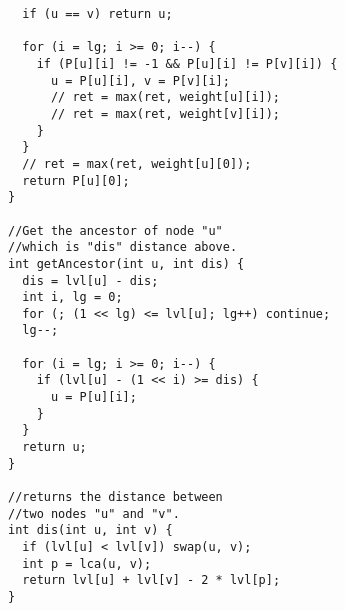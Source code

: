 \documentclass[10pt,a4paper,onesided]{article}
\begin{document}
\begin{multicols*}{3}
\begin{lstlisting}
  if (u == v) return u;

  for (i = lg; i >= 0; i--) {
    if (P[u][i] != -1 && P[u][i] != P[v][i]) {
      u = P[u][i], v = P[v][i];
      // ret = max(ret, weight[u][i]);
      // ret = max(ret, weight[v][i]);
    }
  }
  // ret = max(ret, weight[u][0]);
  return P[u][0];
}

//Get the ancestor of node "u"
//which is "dis" distance above.
int getAncestor(int u, int dis) {
  dis = lvl[u] - dis;
  int i, lg = 0;
  for (; (1 << lg) <= lvl[u]; lg++) continue;
  lg--;

  for (i = lg; i >= 0; i--) {
    if (lvl[u] - (1 << i) >= dis) {
      u = P[u][i];
    }
  }
  return u;
}

//returns the distance between
//two nodes "u" and "v".
int dis(int u, int v) {
  if (lvl[u] < lvl[v]) swap(u, v);
  int p = lca(u, v);
  return lvl[u] + lvl[v] - 2 * lvl[p];
}
\end{lstlisting}

\end{multicols*}
\end{document}
